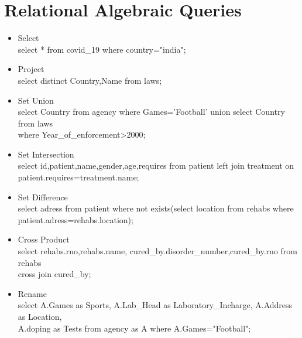\documentclass{report}
\begin{document}
\section{Relational Algebraic Queries}
\begin{itemize}
\item Select\\
select * from covid\_19 where country="india";\\
\item Project\\
select distinct Country,Name from laws;\\
\item Set Union\\ 
select Country from agency where Games='Football' union select Country from laws\\
        where Year\_of\_enforcement>2000;\\
\item Set Intersection\\
select id,patient,name,gender,age,requires from patient left join treatment on\\ 
    patient.requires=treatment.name;\\
\item Set Difference\\
select adress from patient where not exists(select location from rehabs where \\
        patient.adress=rehabs.location);\\
\item Cross Product\\
select rehabs.rno,rehabs.name, cured\_by.disorder\_number,cured\_by.rno from rehabs\\ 
        cross join cured\_by;\\
\item Rename\\
select A.Games as Sports, A.Lab\_Head as Laboratory\_Incharge, A.Address as Location,\\ 
        A.doping as Tests from agency as A where A.Games="Football";\\
\end{itemize}
\end{document}
